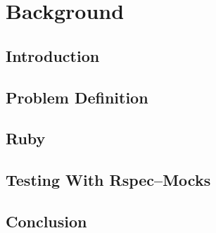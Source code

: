 \chapter{Background}

\section{Introduction}

\section{Problem Definition}

\section{Ruby}

\section{Testing With Rspec--Mocks}

\section{Conclusion}